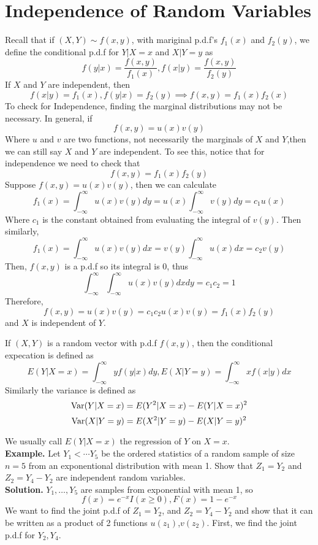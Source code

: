 \documentclass[openany]{report}
\begin{document}
    \section{Independence of Random Variables}
    Recall that if $(X,Y) \sim f(x,y)$, with mariginal p.d.f's $f_1(x)$ and $f_2(y)$, we define the conditional p.d.f for $Y|X = x$ and $X|Y = y$ as 
    \[f(y|x) = \frac{f(x,y)}{f_1(x)}, f(x|y) = \frac{f(x,y)}{f_2(y)}\]
    If $X$ and $Y$ are independent, then 
    \[f(x|y) = f_1(x), f(y|x) = f_2(y) \implies f(x,y) = f_1(x)f_2(x)\]
    To check for Independence, finding the marginal distributions may not be necessary. In general, if 
    \[f(x,y) = u(x)v(y)\]
    Where $u$ and $v$ are two functions, not necessarily the marginals of $X$ and $Y$,then we can still say $X$ and $Y$ are independent. To see this, notice that for independence we need to check that 
    \[f(x,y) = f_1(x)f_2(y)\]
    Suppose $f(x,y) = u(x)v(y)$, then we can calculate 
    \[f_1(x) = \int_{-\infty}^{\infty} u(x)v(y)dy = u(x)\int_{-\infty}^{\infty}v(y)dy = c_1u(x)\]
    Where $c_1$ is the constant obtained from evaluating the integral of $v(y)$. Then similarly,
    \[f_1(x) = \int_{-\infty}^{\infty} u(x)v(y)dx = v(y)\int_{-\infty}^{\infty}u(x)dx = c_2v(y)\]
    Then, $f(x,y)$ is a p.d.f so its integral is 0, thus 
    \[\int_{-\infty}^{\infty}\int_{-\infty}^{\infty}u(x)v(y)dxdy = c_1c_2 = 1\]
    Therefore,
    \[f(x,y) = u(x)v(y) = c_1c_2u(x)v(y) = f_1(x)f_2(y)\]
    and $X$ is independent of $Y$. 
    \begin{definition}
        If $(X,Y)$ is a random vector with p.d.f $f(x,y)$, then the conditional expecation is defined as 
        \[E(Y|X = x) = \int_{-\infty}^{\infty} yf(y|x)dy, E(X|Y = y) = \int_{-\infty}^{\infty} xf(x|y)dx\]
        Similarly the variance is defined as 
        \[\operatorname{Var}(Y|X = x) = E(Y^2|X = x) - E(Y|X = x)^2\]
        \[\operatorname{Var}(X|Y = y) = E(X^2|Y = y) - E(X|Y = y)^2\]
    \end{definition}
    We usually call $E(Y|X=x)$ the regression of $Y$ on $X = x$.\\[2ex]
    \textbf{Example.} Let $Y_1 < \cdots Y_5$ be the ordered statistics of a random sample of size $n=5$ from an exponentional distribution with mean 1. Show that $Z_1 = Y_2$ and $Z_2 = Y_4 - Y_2$ are independent random variables. \\[2ex]
    \textbf{Solution.} $Y_1,\ldots, Y_5$ are samples from exponential with mean 1, so 
    \[f(x) = e^{-x}I(x \geq 0), F(x) = 1 - e^{-x}\]
    We want to find the joint p.d.f of $Z_1 = Y_2$, and $Z_2 = Y_4-Y_2$ and show that it can be written as a product of 2 functions $u(z_1)$,$v(z_2)$. First, we find the joint p.d.f for $Y_2,Y_4$. 
\end{document}
